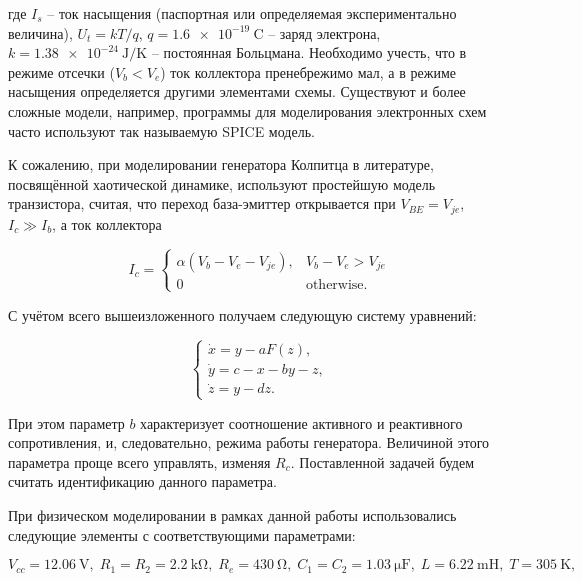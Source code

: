 \documentclass[a4paper,12pt]{article}
\begin{document}
\noindent
где
$I_s$ -- ток насыщения (паспортная или определяемая экспериментально величина),
$U_t=kT/q$,
$q = \SI{1.6e-19}{\coulomb}$ -- заряд электрона,
$k = \SI{1.38e-24}{\joule/\kelvin}$ -- постоянная Больцмана.
Необходимо учесть, что в режиме отсечки ($V_b < V_e$) ток коллектора пренебрежимо мал,
а в режиме насыщения определяется другими элементами схемы.
Существуют и более сложные модели, например,
программы для моделирования электронных схем часто используют так называемую SPICE модель.

К сожалению, при моделировании генератора Колпитца в литературе,
посвящённой хаотической динамике, используют
простейшую модель транзистора, считая, что переход
база-эмиттер открывается при $V_{BE} = V_{je}$, $ I_c \gg I_b$,
а ток коллектора

\begin{equation}
I_c =
  \begin{cases}
    \alpha ( V_b - V_e - V_{je} ), & V_b - V_e > V_{je} \\
    0                              & \text{otherwise}.
  \end{cases}
  \label{atu:eq:bjt_libear_model}
\end{equation}



С учётом всего вышеизложенного получаем следующую систему уравнений:

\begin{equation}
\label{atu:eq:colp}
\begin{cases}
  \dot{x} = y - a F(z), \\
  \dot{y} = c - x - by - z, \\
  \dot{z} = y - d z.
\end{cases}
\end{equation}

При этом параметр $b$ характеризует соотношение
активного и реактивного сопротивления,
и, следовательно, режима работы генератора.
Величиной этого параметра проще всего управлять,
изменяя $R_c$.
Поставленной задачей будем считать идентификацию
данного параметра.

При физическом моделировании в рамках данной работы использовались следующие
элементы с соответствующими параметрами:

\[
  V_{cc} = \SI{12.06}{\volt},          \;
  R_1 = R_2 = \SI{2.2}{\kilo\ohm},     \;
  R_e = \SI{430}{\ohm},                \;
  C_1 = C_2 = \SI{1.03}{\micro\farad}, \;
  L = \SI{6.22}{\milli\henry},         \;
  T = \SI{305}{\kelvin},
\]
\end{document}
